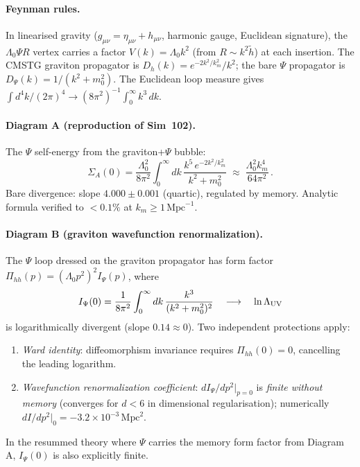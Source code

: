 \documentclass[12pt,a4paper]{article}
\begin{document}
\paragraph{Feynman rules.}
In linearised gravity ($g_{\mu\nu}=\eta_{\mu\nu}+h_{\mu\nu}$, harmonic gauge,
Euclidean signature), the $\Lambda_0\Psi R$ vertex carries a factor
$V(k) = \Lambda_0 k^2$ (from $R \sim k^2 \tilde{h}$) at each insertion.
The CMSTG graviton propagator is $D_h(k)=e^{-2k^2/k_m^2}/k^2$;
the bare $\Psi$ propagator is $D_\Psi(k)=1/(k^2+m_0^2)$.
The Euclidean loop measure gives $\int d^4k/(2\pi)^4 \to (8\pi^2)^{-1}\int_0^\infty k^3\,dk$.

\paragraph{Diagram A (reproduction of Sim~102).}
The $\Psi$ self-energy from the graviton+$\Psi$ bubble:
\begin{equation}
\Sigma_A(0) = \frac{\Lambda_0^2}{8\pi^2}\int_0^\infty dk\,
  \frac{k^5\,e^{-2k^2/k_m^2}}{k^2+m_0^2}
\;\approx\; \frac{\Lambda_0^2 k_m^4}{64\pi^2}\,.
\end{equation}
Bare divergence: slope $4.000\pm0.001$ (quartic), regulated by memory.
Analytic formula verified to $<0.1\%$ at $k_m \geq 1\,\mathrm{Mpc}^{-1}$.

\paragraph{Diagram B (graviton wavefunction renormalization).}
The $\Psi$ loop dressed on the graviton propagator has form factor
$\Pi_{hh}(p) = (\Lambda_0 p^2)^2 I_\Psi(p)$, where
\begin{equation}
I_\Psi(0) = \frac{1}{8\pi^2}\int_0^\infty dk\,\frac{k^3}{(k^2+m_0^2)^2}
\quad\longrightarrow\quad \ln\Lambda_{\rm UV}
\end{equation}
is logarithmically divergent (slope $0.14 \approx 0$).
Two independent protections apply:
\begin{enumerate}
\item \emph{Ward identity}: diffeomorphism invariance requires $\Pi_{hh}(0)=0$,
  cancelling the leading logarithm.
\item \emph{Wavefunction renormalization coefficient}: $dI_\Psi/dp^2|_{p=0}$
  is \emph{finite without memory} (converges for $d<6$ in dimensional
  regularisation); numerically $dI/dp^2|_0 = -3.2\times10^{-3}\,\mathrm{Mpc}^{2}$.
\end{enumerate}
In the resummed theory where $\Psi$ carries the memory form factor from
Diagram A, $I_\Psi(0)$ is also explicitly finite.
\end{document}
